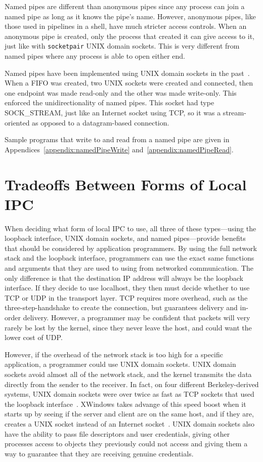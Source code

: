 Named pipes are different than anonymous pipes since any process can join a named pipe as long as it knows the pipe's name.  However, anonymous pipes, like those used in pipelines in a shell, have much stricter access controls.  When an anonymous pipe is created, only the process that created it can give access to it, just like with \texttt{socketpair} UNIX domain sockets.  This is very different from named pipes where any process is able to open either end.

Named pipes have been implemented using UNIX domain sockets in the past~\cite[p 1147]{singh2006mac}.  When a FIFO was created, two UNIX sockets were created and connected, then one endpoint was made read-only and the other was made write-only.  This enforced the unidirectionality of named pipes.  This socket had type SOCK\_STREAM, just like an Internet socket using TCP, so it was a stream-oriented as opposed to a datagram-based connection.

Sample programs that write to and read from a named pipe are given in Appendices~\ref{appendix:namedPipeWrite} and~\ref{appendix:namedPipeRead}.

\section{Tradeoffs Between Forms of Local IPC}
\label{sec:localIPCTradeoffs}
When deciding what form of local IPC to use, all three of these types---using the loopback interface, UNIX domain sockets, and named pipes---provide benefits that should be considered by application programmers.  By using the full network stack and the loopback interface, programmers can use the exact same functions and arguments that they are used to using from networked communication.  The only difference is that the destination IP address will always be the loopback interface.  If they decide to use localhost, they then must decide whether to use TCP or UDP in the transport layer.  TCP requires more overhead, such as the three-step-handshake to create the connection, but guarantees delivery and in-order delivery.  However, a programmer may be confident that packets will very rarely be lost by the kernel, since they never leave the host, and could want the lower cost of UDP.

However, if the overhead of the network stack is too high for a specific application, a programmer could use UNIX domain sockets.  UNIX domain sockets avoid almost all of the network stack, and the kernel transmits the data directly from the sender to the receiver.  In fact, on four different Berkeley-derived systems, UNIX domain sockets were over twice as fast as TCP sockets that used the loopback interface~\cite[p 223--224]{Stevens:1997:UNP:522800}.  XWindows takes advange of this speed boost when it starts up by seeing if the server and client are on the same host, and if they are, creates a UNIX socket instead of an Internet socket~\cite[p 373]{Stevens:1997:UNP:522800}.  UNIX domain sockets also have the ability to pass file descriptors and user credentials, giving other processes access to objects they previously could not access and giving them a way to guarantee that they are receiving genuine credentials.

